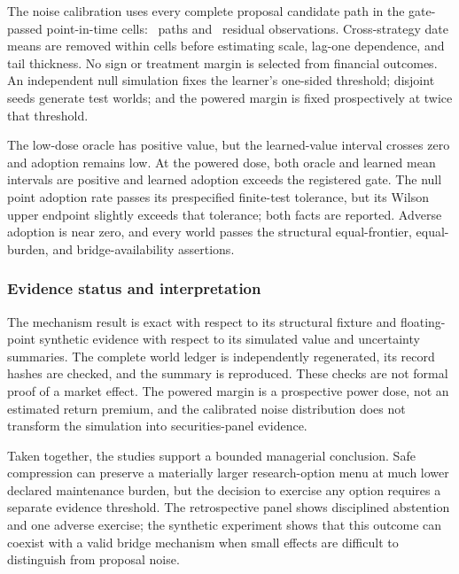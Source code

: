 The noise calibration uses every complete proposal candidate path in the
gate-passed point-in-time cells: \AORPointInTimeCompletePaths\ paths and
\AORPointInTimeResidualObservations\ residual observations. Cross-strategy
date means are removed within cells before estimating scale, lag-one
dependence, and tail thickness. No sign or treatment margin is selected from
financial outcomes. An independent null simulation fixes the learner's
one-sided threshold; disjoint seeds generate test worlds; and the powered
margin is fixed prospectively at twice that threshold.



The low-dose oracle has positive value, but the learned-value interval crosses
zero and adoption remains low. At the powered dose, both oracle and learned
mean intervals are positive and learned adoption exceeds the registered gate.
The null point adoption rate passes its prespecified finite-test tolerance, but
its Wilson upper endpoint slightly exceeds that tolerance; both facts are
reported. Adverse adoption is near zero, and every world passes the structural
equal-frontier, equal-burden, and bridge-availability assertions.

\subsubsection{Evidence status and interpretation}

The mechanism result is exact with respect to its structural fixture and
floating-point synthetic evidence with respect to its simulated value and
uncertainty summaries. The complete world ledger is independently regenerated,
its record hashes are checked, and the summary is reproduced. These checks are
not formal proof of a market effect. The powered margin is a prospective power
dose, not an estimated return premium, and the calibrated noise distribution
does not transform the simulation into securities-panel evidence.

Taken together, the studies support a bounded managerial conclusion. Safe
compression can preserve a materially larger research-option menu at much
lower declared maintenance burden, but the decision to exercise any option
requires a separate evidence threshold. The retrospective panel shows
disciplined abstention and one adverse exercise; the synthetic experiment shows
that this outcome can coexist with a valid bridge mechanism when small effects
are difficult to distinguish from proposal noise.

